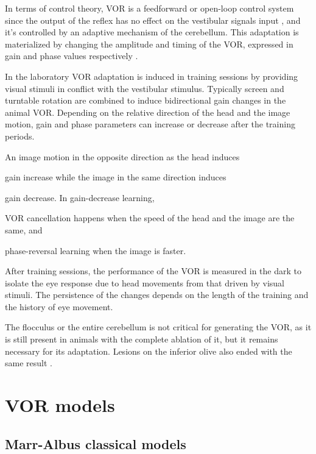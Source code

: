 \documentclass[doc,apacite,a4paper]{apa6}
\begin{document}
In terms of control theory, VOR is a feedforward or open-loop control system since the output of the reflex has no effect on the vestibular signals input \cite{Porrill2007}, and it's controlled by an adaptive mechanism of the cerebellum. This adaptation is materialized by changing the amplitude and timing of the VOR, expressed in gain and phase values respectively \cite{DeZeeuw2005}.

In the laboratory VOR adaptation is induced in training sessions by providing visual stimuli in conflict with the vestibular stimulus. Typically screen and turntable rotation are combined to induce bidirectional gain changes in the animal VOR. Depending on the relative direction of the head and the image motion, gain and phase parameters can increase or decrease after the training periods.

\begin{seriate}
An image motion in the opposite direction as the head induces \item gain increase while the image in the same direction induces \item gain decrease. In gain-decrease learning, \item VOR cancellation happens when the speed of the head and the image are the same, and \item phase-reversal learning when the image is faster.   
\end{seriate}

After training sessions, the performance of the VOR is measured in the dark to isolate the eye response due to head movements from that driven by visual stimuli. The persistence of the changes depends on the length of the training and the history of eye movement.

The flocculus or the entire cerebellum is not critical for generating the VOR, as it is still present in animals with the complete ablation of it, but it remains necessary for its adaptation. Lesions on the inferior olive also ended with the same result \cite{Ito2006}.

\section{VOR models}

\subsection{Marr-Albus classical models}
\end{document}
